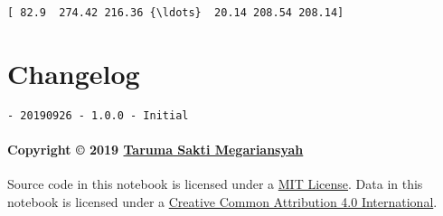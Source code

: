 \documentclass[11pt]{article}
\begin{document}
    \begin{Verbatim}[commandchars=\\\{\}]
[ 82.9  274.42 216.36 {\ldots}  20.14 208.54 208.14]
    \end{Verbatim}

    \hypertarget{changelog}{%
\section{Changelog}\label{changelog}}

\begin{verbatim}
- 20190926 - 1.0.0 - Initial
\end{verbatim}

\hypertarget{copyright-2019-taruma-sakti-megariansyah}{%
\paragraph{\texorpdfstring{Copyright © 2019
\href{https://taruma.github.io}{Taruma Sakti
Megariansyah}}{Copyright © 2019 Taruma Sakti Megariansyah}}\label{copyright-2019-taruma-sakti-megariansyah}}

Source code in this notebook is licensed under a
\href{https://choosealicense.com/licenses/mit/}{MIT License}. Data in
this notebook is licensed under a
\href{https://creativecommons.org/licenses/by/4.0/}{Creative Common
Attribution 4.0 International}.


    
    
    
\end{document}
